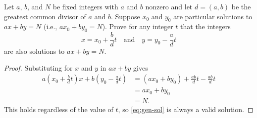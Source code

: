  Let $a$, $b$, and $N$ be fixed integers with $a$ and $b$
nonzero and let $d = (a, b)$ be the greatest common divisor of $a$ and
$b$. Suppose $x_0$ and $y_0$ are particular solutions to $ax + by = N$
(i.e., $ax_0 + by_0 = N$). Prove for any integer $t$ that the integers
\begin{equation}
  \label{eq:gen-sol}
  x = x_0 + \frac{b}{d}t \quad\text{and}\quad y = y_0 - \frac{a}{d}t
\end{equation}
are also solutions to $ax + by = N$.
\begin{proof}
  Substituting for $x$ and $y$ in $ax + by$ gives
  \begin{align*}
    a\left(x_0 + \frac{b}{d}t\right)x + b\left(y_0 - \frac{a}{d}t\right)
    &= (ax_0 + by_0) + \frac{ab}{d}t - \frac{ab}dt \\
    &= ax_0 + by_0 \\
    &= N.
  \end{align*}
  This holds regardless of the value of $t$, so \eqref{eq:gen-sol} is
  always a valid solution.
\end{proof}

